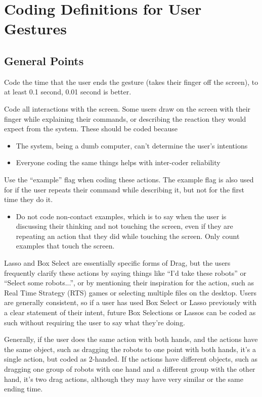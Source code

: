 \chapter{Coding Definitions for User Gestures}

\section{General Points} \label{section:General_Points}

Code the time that the user ends the gesture (takes their finger off the screen), to at least 0.1 second, 0.01 second is better. 
 
Code all interactions with the screen. Some users draw on the screen with their finger while explaining their commands, or describing the reaction they would expect from the system. These should be coded because 
\begin{itemize}
	\item The system, being a dumb computer, can't determine the user's intentions
	\item Everyone coding the same things helps with inter-coder reliability 
\end{itemize}

Use the ``example'' flag when coding these actions. The example flag is also used for if the user repeats their command while describing it, but not for the first time they do it. 
\begin{itemize}
	\item Do not code non-contact examples, which is to say when the user is discussing their thinking and not touching the screen, even if they are repeating an action that they did while touching the screen. Only count examples that touch the screen. 
\end{itemize}
 
Lasso and Box Select are essentially specific forms of Drag, but the users frequently clarify these actions by saying things like ``I'd take these robots'' or ``Select some robots...'', or by mentioning their inspiration for the action, such as Real Time Strategy (RTS) games or selecting multiple files on the desktop. Users are generally consistent, so if a user has used Box Select or Lasso previously with a clear statement of their intent, future Box Selections or Lassos can be coded as such without requiring the user to say what they're doing. 
 
Generally, if the user does the same action with both hands, and the actions have the same object, such as dragging the robots to one point with both hands, it's a single action, but coded as 2-handed. If the actions have different objects, such as dragging one group of robots with one hand and a different group with the other hand, it's two drag actions, although they may have very similar or the same ending time. 

